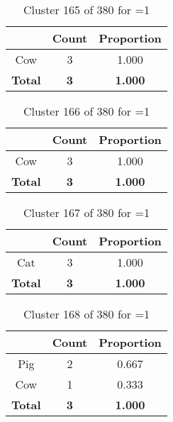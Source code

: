 \begin{table}[ht!]
\centering
\begin{tabular}{|c|c|c|}
\hline
\bf \Spec{} &\bf Count &\bf Proportion\\ \hline \hline
Cow & 3 & 1.000\\ \hline
\hline
\bf Total & \bf 3 & \bf 1.000\\ \hline
\end{tabular}
\label{tab:cluster:165:1}
\caption{Cluster 165 of 380 for \minneigh{}=1}
\end{table}

\begin{table}[ht!]
\centering
\begin{tabular}{|c|c|c|}
\hline
\bf \Spec{} &\bf Count &\bf Proportion\\ \hline \hline
Cow & 3 & 1.000\\ \hline
\hline
\bf Total & \bf 3 & \bf 1.000\\ \hline
\end{tabular}
\label{tab:cluster:166:1}
\caption{Cluster 166 of 380 for \minneigh{}=1}
\end{table}

\begin{table}[ht!]
\centering
\begin{tabular}{|c|c|c|}
\hline
\bf \Spec{} &\bf Count &\bf Proportion\\ \hline \hline
Cat & 3 & 1.000\\ \hline
\hline
\bf Total & \bf 3 & \bf 1.000\\ \hline
\end{tabular}
\label{tab:cluster:167:1}
\caption{Cluster 167 of 380 for \minneigh{}=1}
\end{table}

\begin{table}[ht!]
\centering
\begin{tabular}{|c|c|c|}
\hline
\bf \Spec{} &\bf Count &\bf Proportion\\ \hline \hline
Pig & 2 & 0.667\\ \hline
Cow & 1 & 0.333\\ \hline
\hline
\bf Total & \bf 3 & \bf 1.000\\ \hline
\end{tabular}
\label{tab:cluster:168:1}
\caption{Cluster 168 of 380 for \minneigh{}=1}
\end{table}

